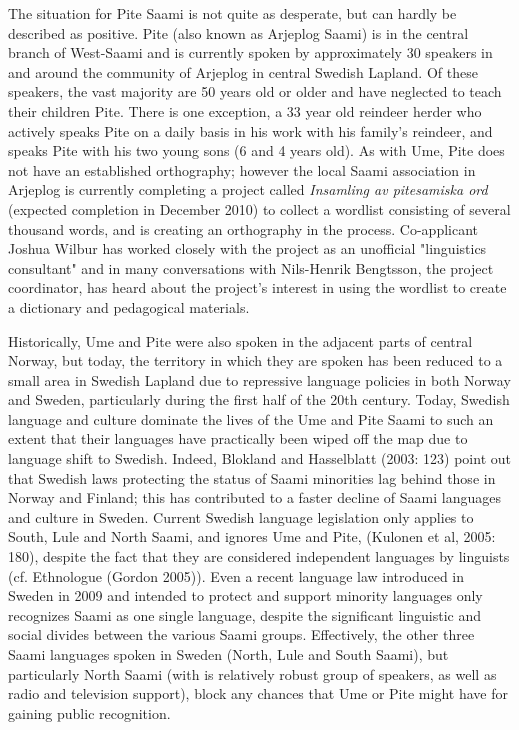 \documentclass[a4paper,12pt]{article}
\begin{document}
The situation for Pite Saami is not quite as desperate, but can hardly be described as positive. Pite (also known as Arjeplog Saami) is in the central branch of West-Saami and is currently spoken by approximately 30 speakers in and around the community of Arjeplog in central Swedish Lapland. Of these speakers, the vast majority are 50 years old or older and have neglected to teach their children Pite. There is one exception, a 33 year old reindeer herder who actively speaks Pite on a daily basis in his work with his family's reindeer, and speaks Pite with his two young sons (6 and 4 years old). As with Ume, Pite does not have an established orthography; however the local Saami association in Arjeplog is currently completing a project called \textit{Insamling av pitesamiska ord} (expected completion in December 2010) to collect a wordlist consisting of several thousand words, and is creating an orthography in the process. Co-applicant Joshua Wilbur has worked closely with the project as an unofficial "linguistics consultant" and in many conversations with Nils-Henrik Bengtsson, the project coordinator, has heard about the project's interest in using the wordlist to create a dictionary and pedagogical materials.%

Historically, Ume and Pite were also spoken in the adjacent parts of central Norway, but today, the territory in which they are spoken has been reduced to a small area in Swedish Lapland due to repressive language policies in both Norway and Sweden, particularly during the first half of the 20th century. Today, Swedish language and culture dominate the lives of the Ume and Pite Saami to such an extent that their languages have practically been wiped off the map due to language shift to Swedish. Indeed, Blokland and Hasselblatt (2003: 123) point out that Swedish laws protecting the status of Saami minorities lag behind those in Norway and Finland; this has contributed to a faster decline of Saami languages and culture in Sweden. Current Swedish language legislation only applies to South, Lule and North Saami, and ignores Ume and Pite, (Kulonen et al, 2005: 180), despite the fact that they are considered independent languages by linguists (cf. Ethnologue (Gordon 2005)). Even a recent language law introduced in Sweden in 2009 and intended to protect and support minority languages only recognizes Saami as one single language, despite the significant linguistic and social divides between the various Saami groups. Effectively, the other three Saami languages spoken in Sweden (North, Lule and South Saami), but particularly North Saami (with is relatively robust group of speakers, as well as radio and television support), block any chances that Ume or Pite might have for gaining public recognition. %
\end{document}
